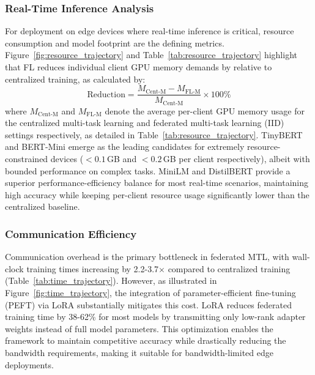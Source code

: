 \subsubsection{Real-Time Inference Analysis}
For deployment on edge devices where real-time inference is critical, resource consumption and model footprint are the defining metrics. Figure~\ref{fig:resource_trajectory} and Table~\ref{tab:resource_trajectory} highlight that FL reduces individual client GPU memory demands by  relative to centralized training, as calculated by:
\begin{equation} \label{eq:mem_reduction}
    \text{Reduction} = \frac{M_{\text{Cent-M}} - M_{\text{FL-M}}}{M_{\text{Cent-M}}} \times 100\%
\end{equation}
where $M_{\text{Cent-M}}$ and $M_{\text{FL-M}}$ denote the average per-client GPU memory usage for the centralized multi-task learning and federated multi-task learning (IID) settings respectively, as detailed in Table~\ref{tab:resource_trajectory}.
TinyBERT and BERT-Mini emerge as the leading candidates for extremely resource-constrained devices ($<0.1$\,GB and $<0.2$\,GB per client respectively), albeit with bounded performance on complex tasks. MiniLM and DistilBERT provide a superior performance-efficiency balance for most real-time scenarios, maintaining high accuracy while keeping per-client resource usage significantly lower than the centralized baseline.

\subsubsection{Communication Efficiency}
Communication overhead is the primary bottleneck in federated MTL, with wall-clock training times increasing by 2.2-3.7$\times$ compared to centralized training (Table~\ref{tab:time_trajectory}). However, as illustrated in Figure~\ref{fig:time_trajectory}, the integration of parameter-efficient fine-tuning (PEFT) via LoRA \cite{hu2022lora} substantially mitigates this cost. LoRA reduces federated training time by 38-62\% for most models by transmitting only low-rank adapter weights instead of full model parameters. This optimization enables the framework to maintain competitive accuracy while drastically reducing the bandwidth requirements, making it suitable for bandwidth-limited edge deployments.




